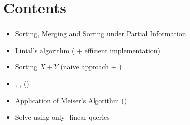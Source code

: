 \section{Contents}
\begin{frame}\frametitle{\insertsection}\justifying
{}
\begin{itemize}[label={\color{prussianblue}$\bullet$},itemsep=6pt]
\item Sorting, Merging and Sorting under Partial Information\pause
\item Linial's algorithm (\citet*{linial:1984} + {efficient implementation})\pause
\item Sorting \(X+Y\) (naive approach + \citet*{fredman:1976})\pause
\item \threeSUM{}, \kSUM{}, \kLDT{} (\citet*{gronlund:2014})\pause
\item {Application} of Meiser's Algorithm (\citet*{meiser:1993})\pause
\item {Solve \kSUM{} using only -linear queries}
\end{itemize}
\end{frame}
